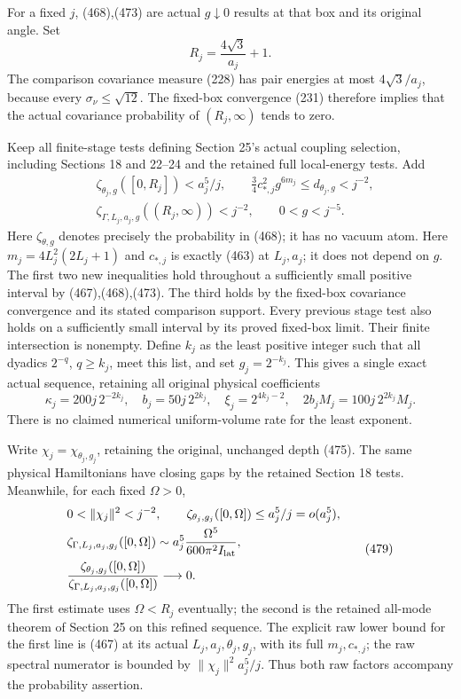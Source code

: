 \documentclass[
  11pt,
]{article}
\begin{document}
For a fixed \(j\), (468),(473) are actual \(g\downarrow0\) results at
that box and its original angle. Set \[
 R_j=\frac{4\sqrt3}{a_j}+1.
 \tag{476}
\] The comparison covariance measure (228) has pair energies at most
\(4\sqrt3/a_j\), because every \(\sigma_\nu\le\sqrt{12}\). The fixed-box
convergence (231) therefore implies that the actual covariance
probability of \((R_j,\infty)\) tends to zero.

Keep all finite-stage tests defining Section 25's actual coupling
selection, including Sections 18 and 22--24 and the retained full
local-energy tests. Add \[
 \begin{split}
 &\zeta_{\theta_j,g}([0,R_j])<a_j^5/j,\qquad
    \tfrac34c_{*,j}^2g^{6m_j}\le d_{\theta_j,g}<j^{-2},\\
 &\zeta_{\Gamma,L_j,a_j,g}((R_j,\infty))<j^{-2},
                       \qquad 0<g<j^{-5}.
 \end{split}\tag{477}
\] Here \(\zeta_{\theta,g}\) denotes precisely the probability in (468);
it has no vacuum atom. Here \(m_j=4L_j^2(2L_j+1)\) and \(c_{*,j}\) is
exactly (463) at \(L_j,a_j\); it does not depend on \(g\). The first two
new inequalities hold throughout a sufficiently small positive interval
by (467),(468),(473). The third holds by the fixed-box covariance
convergence and its stated comparison support. Every previous stage test
also holds on a sufficiently small interval by its proved fixed-box
limit. Their finite intersection is nonempty. Define \(k_j\) as the
least positive integer such that all dyadics \(2^{-q}\), \(q\ge k_j\),
meet this list, and set \(g_j=2^{-k_j}\). This gives a single exact
actual sequence, retaining all original physical coefficients \[
 \kappa_j=200j\,2^{-2k_j},\quad
 b_j=50j\,2^{2k_j},\quad
 \xi_j=2^{4k_j-2},\quad
 2b_jM_j=100j\,2^{2k_j}M_j.
 \tag{478}
\] There is no claimed numerical uniform-volume rate for the least
exponent.

Write \(\chi_j=\chi_{\theta_j,g_j}\), retaining the original, unchanged
depth (475). The same physical Hamiltonians have closing gaps by the
retained Section 18 tests. Meanwhile, for each fixed \(\Omega>0\), \[
 \begin{split}
 &0<\|\chi_j\|^2<j^{-2},\qquad
   \zeta_{\theta_j,g_j}([0,\Omega])\le a_j^5/j
                                     =o(a_j^5),\\
 &\zeta_{\Gamma,L_j,a_j,g_j}([0,\Omega])
       \sim a_j^5\frac{\Omega^5}{600\pi^2I_{\rm lat}},\\
 &\frac{\zeta_{\theta_j,g_j}([0,\Omega])}
           {\zeta_{\Gamma,L_j,a_j,g_j}([0,\Omega])}
                                  \longrightarrow0 .
 \end{split}\tag{479}
\] The first estimate uses \(\Omega<R_j\) eventually; the second is the
retained all-mode theorem of Section 25 on this refined sequence. The
explicit raw lower bound for the first line is (467) at its actual
\(L_j,a_j,\theta_j,g_j\), with its full \(m_j,c_{*,j}\); the raw
spectral numerator is bounded by \(\|\chi_j\|^2a_j^5/j\). Thus both raw
factors accompany the probability assertion.
\end{document}
